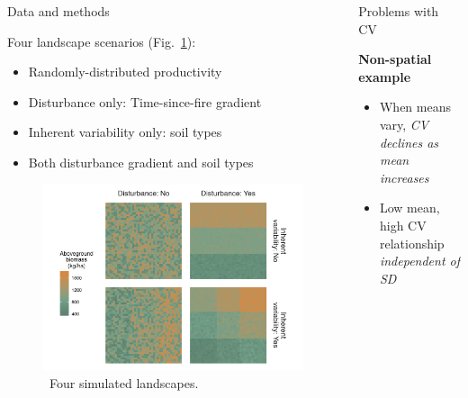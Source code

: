 \begin{frame}[t]
\begin{columns}[t]
\begin{column}{\twocolwid}
\begin{columns}[T]
\begin{column}{0.4\textwidth}
\begin{alertblock}{Data and methods}
{Four landscape scenarios (Fig.~\ref{SpatialData}):
\begin{itemize}
	\item Randomly-distributed productivity
	\item Disturbance only: Time-since-fire gradient
	\item Inherent variability only: soil types
	\item Both disturbance gradient and soil types
\end{itemize}
		\begin{center}
	\begin{figure}
		\includegraphics[]{figure/SpatialData}
		\caption{~Four simulated landscapes.}
		\label{SpatialData}
	\end{figure}
\end{center}		}
		
	\end{alertblock} 


\end{column}%
\hfill%
\begin{column}{0.6\textwidth} %
	\vspace{-2cm}
		\begin{block}{Problems with CV} \end{block}
\vspace{-1cm}
\textbf{Non-spatial example}
\begin{itemize}
	\item When means vary, \emph{CV declines as mean increases}
	\item Low mean, high CV relationship \emph{independent of SD}
\end{itemize} 


\end{column}
\end{columns}
\end{column}
\end{columns}
\end{frame}
